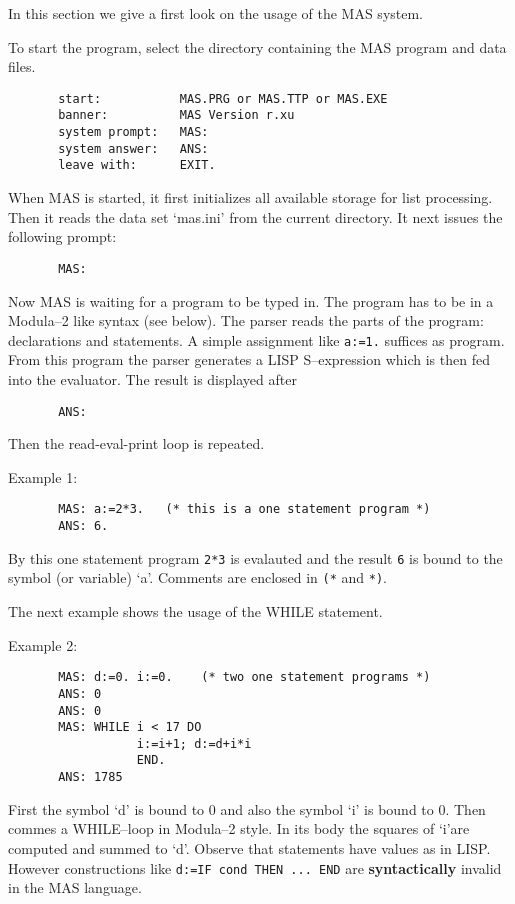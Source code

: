 In this section we give a first look on the usage of the 
MAS system. 

To start the program,
select the directory containing the 
MAS program and data files.
\begin{verbatim}
       start:           MAS.PRG or MAS.TTP or MAS.EXE
       banner:          MAS Version r.xu
       system prompt:   MAS: 
       system answer:   ANS: 
       leave with:      EXIT. 
\end{verbatim}

When MAS is started, it first initializes all available 
storage for
list processing. Then it reads the data set
`mas.ini' from the current
directory. It next issues the following prompt: 

\begin{verbatim}
       MAS: 
\end{verbatim}

Now MAS is waiting for a program to be typed in. The program has to
be in a Modula--2 like syntax (see below). 
The parser reads the parts
of the program: declarations and statements. 
A simple assignment like
\verb/a:=1./ suffices as program. 
From this program the parser generates
a LISP S--expression 
which is then fed into the evaluator. The result
is displayed after 

\begin{verbatim}
       ANS: 
\end{verbatim}

Then the read-eval-print loop is repeated.

Example 1:
\begin{verbatim}
       MAS: a:=2*3.   (* this is a one statement program *)
       ANS: 6. 
\end{verbatim}
By this one statement program \verb/2*3/ is evalauted and 
the result \verb/6/ is bound to the symbol (or variable) `a'. 
Comments are enclosed in \verb/(*/ and \verb/*)/.

The next example shows the usage of the WHILE statement.

Example 2:
\begin{verbatim}
       MAS: d:=0. i:=0.    (* two one statement programs *)
       ANS: 0                 
       ANS: 0                 
       MAS: WHILE i < 17 DO     
                  i:=i+1; d:=d+i*i 
                  END.              
       ANS: 1785                 
\end{verbatim}
First the symbol `d' is bound to 0 and also 
the symbol `i' is bound to 0. 
Then commes a WHILE--loop in Modula--2 style. 
In its body the squares of `i'are computed and 
summed to `d'.
Observe that statements have values as in LISP.
However constructions like
\verb/d:=IF cond THEN ... END/ are {\bf syntactically} 
invalid in the MAS language.

